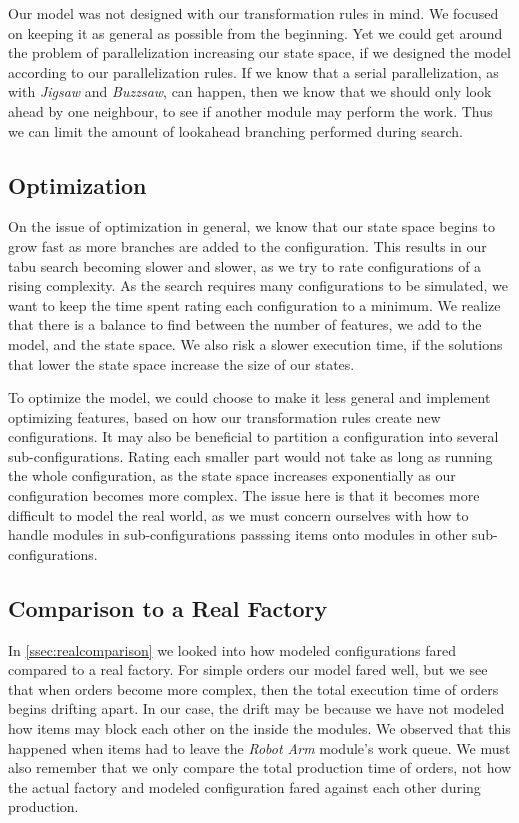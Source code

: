 Our model was not designed with our transformation rules in mind. We focused on keeping it as general as possible from the beginning. Yet we could get around the problem of parallelization increasing our state space, if we designed the model according to our parallelization rules. If we know that a serial parallelization, as with \textit{Jigsaw} and \textit{Buzzsaw}, can happen, then we know that we should only look ahead by one neighbour, to see if another module may perform the work. Thus we can limit the amount of lookahead branching performed during search.   

\subsection{Optimization}
On the issue of optimization in general, we know that our state space begins to grow fast as more branches are added to the configuration. This results in our tabu search becoming slower and slower, as we try to rate configurations of a rising complexity. As the search requires many configurations to be simulated, we want to keep the time spent rating each configuration to a minimum. We realize that there is a balance to find between the number of features, we add to the model, and the state space. We also risk a slower execution time, if the solutions that lower the state space increase the size of our states.

To optimize the model, we could choose to make it less general and implement optimizing features, based on how our transformation rules create new configurations. It may also be beneficial to partition a configuration into several sub-configurations. Rating each smaller part would not take as long as running the whole configuration, as the state space increases exponentially as our configuration becomes more complex. The issue here is that it becomes more difficult to model the real world, as we must concern ourselves with how to handle modules in sub-configurations passsing items onto modules in other sub-configurations. 

\subsection{Comparison to a Real Factory}
In \cref{ssec:realcomparison} we looked into how modeled configurations fared compared to a real factory. For simple orders our model fared well, but we see that when orders become more complex, then the total execution time of orders begins drifting apart. In our case, the drift may be because we have not modeled how items may block each other on the inside the modules. We observed that this happened when items had to leave the \textit{Robot Arm} module's work queue. We must also remember that we only compare the total production time of orders, not how the actual factory and modeled configuration fared against each other during production.

